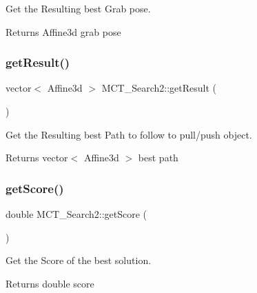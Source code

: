 Get the Resulting best Grab pose. 

\begin{DoxyReturn}{Returns}
Affine3d grab pose 
\end{DoxyReturn}
\mbox{\label{classMCT__Search2_aa20bc38f16b562fcd6ece9605e371a30}} 
\subsubsection{\texorpdfstring{get\+Result()}{getResult()}}
{\footnotesize\ttfamily vector$<$ Affine3d $>$ M\+C\+T\+\_\+\+Search2\+::get\+Result (\begin{DoxyParamCaption}{ }\end{DoxyParamCaption})\hspace{0.3cm}{\ttfamily [inline]}}



Get the Resulting best Path to follow to pull/push object. 

\begin{DoxyReturn}{Returns}
vector$<$ Affine3d $>$ best path 
\end{DoxyReturn}
\mbox{\label{classMCT__Search2_a8cf59fa0e37982592de526ce450d1331}} 
\subsubsection{\texorpdfstring{get\+Score()}{getScore()}}
{\footnotesize\ttfamily double M\+C\+T\+\_\+\+Search2\+::get\+Score (\begin{DoxyParamCaption}{ }\end{DoxyParamCaption})\hspace{0.3cm}{\ttfamily [inline]}}



Get the Score of the best solution. 

\begin{DoxyReturn}{Returns}
double score 
\end{DoxyReturn}
\mbox{\label{classMCT__Search2_a34c5b319ed38d852d2bbeadb80fe41e2}} 

